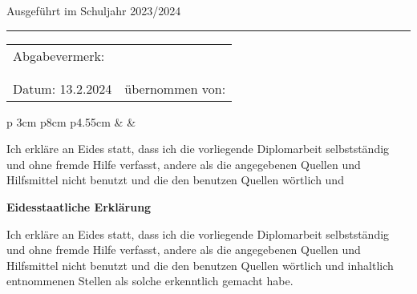 \documentclass[titlepage,12pt,twoside]{article}
\begin{document}
\begin{titlepage}
\begin{tabular}{llr}
	\end{tabular}
	
	
	
	\vspace{1.5cm}
	\normalsize
	Ausgeführt im Schuljahr 2023/2024\\
	\vspace{0.7cm}
	\noindent\rule{\textwidth}{1pt}
	\begin{tabular}{lr}
	Abgabevermerk:\\
	\\
	\\
	Datum: 13.2.2024 &\hspace{4cm}   übernommen von:\\
	\end{tabular}
	
	\end{titlepage}
	
	\newpage
	\thispagestyle{empty}
	\clearpage\mbox{}\clearpage


\thispagestyle{empty}
	
\begin {center}
	\begin{tabular} {p {3cm} p{8cm} p{4.55cm}}
  & 
  & 
  \vspace{1mm}\\ 
\end{tabular}

\hspace{40mm}

\color{white}
Ich erkläre an Eides statt, dass ich die vorliegende Diplomarbeit selbstständig und ohne fremde Hilfe verfasst, andere als die angegebenen Quellen und Hilfsmittel nicht benutzt und die den benutzen Quellen wörtlich und
	
\color{blue}	
\Large{\bfseries{Eidesstaatliche Erklärung}}	
\color{black}	

\end {center}

\hspace{10mm}

Ich erkläre an Eides statt, dass ich die vorliegende Diplomarbeit selbstständig und ohne fremde Hilfe verfasst, andere als die angegebenen Quellen und Hilfsmittel nicht benutzt und die den benutzen Quellen wörtlich und inhaltlich entnommenen Stellen als solche erkenntlich gemacht habe.
\end{document}
